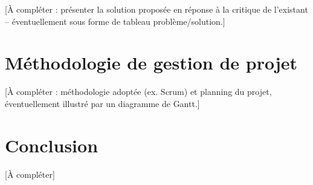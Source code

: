 [\`A compl\'eter : pr\'esenter la solution propos\'ee en r\'eponse \`a la
critique de l'existant -- \'eventuellement sous forme de tableau
probl\`eme/solution.]

\section{M\'ethodologie de gestion de projet}

[\`A compl\'eter : m\'ethodologie adopt\'ee (ex. Scrum) et planning du
projet, \'eventuellement illustr\'e par un diagramme de Gantt.]


\section{Conclusion}

[\`A compl\'eter]

\clearpage
